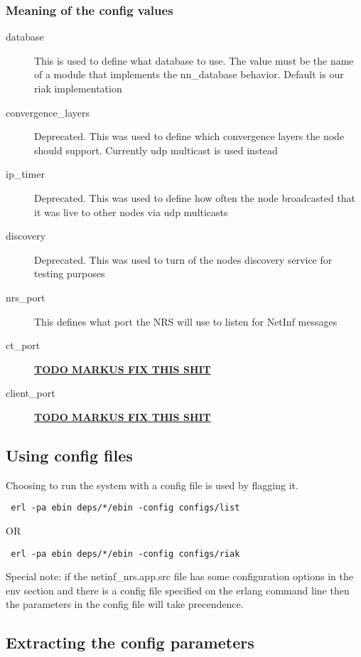 \subsubsection {Meaning of the config values}
\begin{description}
\item[database]
This is used to define what database to use. The value must be the name of a module that implements the nn\_database behavior. Default is our riak implementation
\item[convergence\_layers]
Deprecated. This was used to define which convergence layers the node should support. Currently udp multicast is used instead
\item[ip\_timer]
Deprecated. This was used to define how often the node broadcasted that it was live to other nodes via udp multicasts
\item[discovery]
Deprecated. This was used to turn of the nodes discovery service for testing purposes
\item[nrs\_port]
This defines what port the NRS will use to listen for NetInf messages
\item[ct\_port]
\underline{\textbf{TODO MARKUS FIX THIS SHIT}}
\item[client\_port]
\underline{\textbf{TODO MARKUS FIX THIS SHIT}}
\end{description}

\subsection {Using config files}

Choosing to run the system with a config file is used by flagging it.

\begin {verbatim}
 erl -pa ebin deps/*/ebin -config configs/list
\end{verbatim}

OR

\begin {verbatim}
 erl -pa ebin deps/*/ebin -config configs/riak
\end{verbatim}

Special note: if the netinf\_nrs.app.src file has some configuration options in the env section and there is a config file specified on the erlang command line then the parameters in the config file  will take precendence.

\subsection {Extracting the config parameters}

